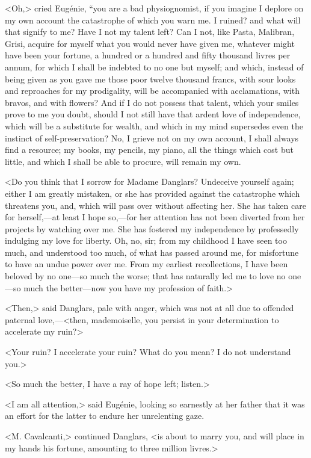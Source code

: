  <Oh,> cried Eugénie, “you are a bad physiognomist, if you imagine I deplore on my own account the catastrophe of which you warn me. I ruined? and what will that signify to me? Have I not my talent left? Can I not, like Pasta, Malibran, Grisi, acquire for myself what you would never have given me, whatever might have been your fortune, a hundred or a hundred and fifty thousand livres per annum, for which I shall be indebted to no one but myself; and which, instead of being given as you gave me those poor twelve thousand francs, with sour looks and reproaches for my prodigality, will be accompanied with acclamations, with bravos, and with flowers? And if I do not possess that talent, which your smiles prove to me you doubt, should I not still have that ardent love of independence, which will be a substitute for wealth, and which in my mind supersedes even the instinct of self-preservation? No, I grieve not on my own account, I shall always find a resource; my books, my pencils, my piano, all the things which cost but little, and which I shall be able to procure, will remain my own. 

 <Do you think that I sorrow for Madame Danglars? Undeceive yourself again; either I am greatly mistaken, or she has provided against the catastrophe which threatens you, and, which will pass over without affecting her. She has taken care for herself,—at least I hope so,—for her attention has not been diverted from her projects by watching over me. She has fostered my independence by professedly indulging my love for liberty. Oh, no, sir; from my childhood I have seen too much, and understood too much, of what has passed around me, for misfortune to have an undue power over me. From my earliest recollections, I have been beloved by no one—so much the worse; that has naturally led me to love no one—so much the better—now you have my profession of faith.> 

 <Then,> said Danglars, pale with anger, which was not at all due to offended paternal love,—<then, mademoiselle, you persist in your determination to accelerate my ruin?> 

 <Your ruin? I accelerate your ruin? What do you mean? I do not understand you.> 

 <So much the better, I have a ray of hope left; listen.> 

 <I am all attention,> said Eugénie, looking so earnestly at her father that it was an effort for the latter to endure her unrelenting gaze. 

 <M. Cavalcanti,> continued Danglars, <is about to marry you, and will place in my hands his fortune, amounting to three million livres.> 

